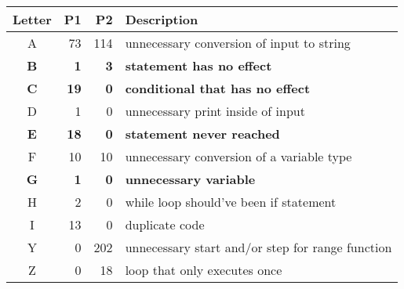 \vspace{2em}
\small
\begin{supertabular}{crrl}
\label{labelsA}
Letter & P1 & P2 & Description \\ 
\toprule
A & 73 & 114 & unnecessary conversion of input to string \\
\textbf{B} &\textbf{ 1} &\textbf{ 3} & \textbf{statement has no effect} \\
 \textbf{C} &\textbf{ 19} &\textbf{ 0} & \textbf{conditional that has no effect} \\
D & 1 & 0 & unnecessary print inside of input \\
 \textbf{E} & \textbf{18} & \textbf{0} & \textbf{statement never reached} \\
F & 10 & 10 & unnecessary conversion of a variable type \\
 \textbf{G} &\textbf{ 1} & \textbf{0} & \textbf{unnecessary variable} \\
H & 2 & 0 & while loop should've been if statement \\
I & 13 & 0 & duplicate code \\
Y & 0 & 202 & unnecessary start and/or step for range function \\
Z & 0 & 18 & loop that only executes once \\
\end{supertabular}
\vspace{2em}